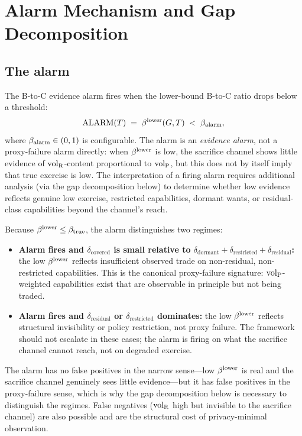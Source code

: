 \section{Alarm Mechanism and Gap Decomposition}
\label{sec:gap_decomposition}

\subsection{The alarm}

\begin{definition}
\label{def:alarm}
The B-to-C evidence alarm fires when the lower-bound B-to-C
ratio drops below a threshold:
\[
  \mathrm{ALARM}(T) \;=\; \beta^{\mathrm{lower}}(G, T) \;<\; \beta_{\mathrm{alarm}},
\]
where $\beta_{\mathrm{alarm}} \in (0, 1)$ is configurable.  The alarm is an
\emph{evidence alarm}, not a proxy-failure alarm directly: when
$\beta^{\mathrm{lower}}$ is low, the sacrifice channel shows little evidence of
${\operatorname{vol}_{\mathrm{R}}}$-content proportional to ${\operatorname{vol}_{\mathrm{P}}}$, but this does not by
itself imply that true exercise is low.  The interpretation of a
firing alarm requires additional analysis (via the gap
decomposition below) to determine whether low evidence reflects
genuine low exercise, restricted capabilities, dormant wants,
or residual-class capabilities beyond the channel's reach.
\end{definition}

\begin{remark}
\label{rem:alarm_interpretation}
Because $\beta^{\mathrm{lower}} \leq \beta_{\mathrm{true}}$, the alarm distinguishes two
regimes:
\begin{itemize}
\item \textbf{Alarm fires and $\delta_{\mathrm{covered}}$ is
  small relative to $\delta_{\mathrm{dormant}} +
  \delta_{\mathrm{restricted}} + \delta_{\mathrm{residual}}$:}
  the low $\beta^{\mathrm{lower}}$ reflects insufficient observed trade on
  non-residual, non-restricted capabilities.  This is the
  canonical proxy-failure signature: ${\operatorname{vol}_{\mathrm{P}}}$-weighted capabilities
  exist that are observable in principle but not being traded.
\item \textbf{Alarm fires and $\delta_{\mathrm{residual}}$ or
  $\delta_{\mathrm{restricted}}$ dominates:} the low $\beta^{\mathrm{lower}}$
  reflects structural invisibility or policy restriction, not
  proxy failure.  The framework should not escalate in these
  cases; the alarm is firing on what the sacrifice channel cannot
  reach, not on degraded exercise.
\end{itemize}
The alarm has no false positives in the narrow sense---low
$\beta^{\mathrm{lower}}$ is real and the sacrifice channel genuinely sees little
evidence---but it has false positives in the proxy-failure
sense, which is why the gap decomposition below is necessary to
distinguish the regimes.  False negatives (${\operatorname{vol}_{\mathrm{R}}}$ high but
invisible to the sacrifice channel) are also possible and are
the structural cost of privacy-minimal observation.
\end{remark}

